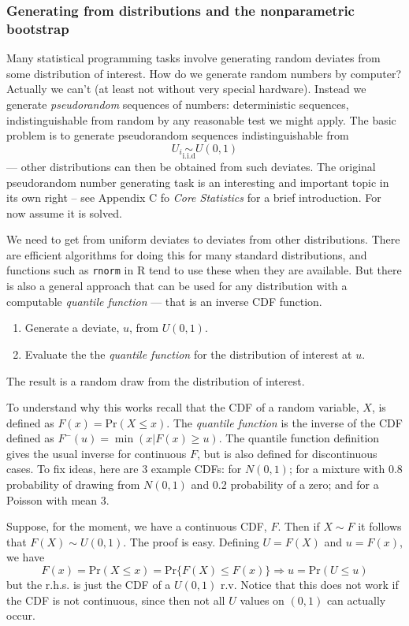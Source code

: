 \documentclass[10pt] {article}
\newcommand{\eps}[3]
{{\begin{center}
 \rotatebox{#1}{\scalebox{#2}{\texttt{[image: \#3]}}}
 \end{center}}
}
\theoremstyle{definition}
\begin{document}
\subsubsection{Generating from distributions and the nonparametric bootstrap}

Many statistical programming tasks involve generating random deviates from some distribution of interest. How do we generate random numbers by computer? Actually we can't (at least not without very special hardware). Instead we generate {\em pseudorandom} sequences of numbers: deterministic sequences, indistinguishable from random by any reasonable test we might apply. The basic problem is to generate pseudorandom sequences indistinguishable from $$U_i \underset{\text{i.i.d}}{\sim} U(0,1)$$ --- other distributions can then be obtained from such deviates. The original pseudorandom number generating task is an interesting and important topic in its own right -- see Appendix C fo {\em Core Statistics} for a brief introduction. For now assume it is solved.

We need to get from uniform deviates to deviates from other distributions. There are efficient algorithms for doing this for many standard distributions, and functions such as {\tt rnorm} in R tend to use these when they are available. But there is also a general approach that can be used for any distribution with a computable {\em quantile function} --- that is an inverse CDF function.   
\begin{enumerate}
\item Generate a deviate, $u$, from $U(0,1)$.
\item Evaluate the the {\em quantile function} for the distribution of interest at $u$.
\end{enumerate}
The result is a random draw from the distribution of interest.

To understand why this works recall that the CDF of a random variable, $X$, is defined as $F(x) = \text{Pr}(X \le x)$. The {\em quantile function} is the inverse of the CDF defined as $F^-(u) = \min(x|F(x) \ge u)$. The quantile function definition gives the usual inverse for continuous $F$, but is also defined for discontinuous cases. To fix ideas, here are 3 example CDFs: for $N(0,1)$; for a mixture with 0.8 probability of drawing from $N(0,1)$ and 0.2 probability of a zero; and for a Poisson with mean 3. 
\eps{-90}{.5}{cdf.eps}
Suppose, for the moment, we have a continuous CDF, $F$. Then if $X \sim F$ it follows that $F(X)\sim U(0,1)$. The proof is easy. Defining $U = F(X) $ and $u = F(x)$, we have
$$ F(x) = \text{Pr}(X \le x) =  \text{Pr}\{F(X) \le F(x)\} \Rightarrow u = \text{Pr}(U \le u)$$
but the r.h.s. is just the CDF of a $U(0,1)$ r.v. Notice that this does not work if the CDF is not continuous, since then not all $U$ values on $(0,1)$ can actually occur. 
\end{document}
